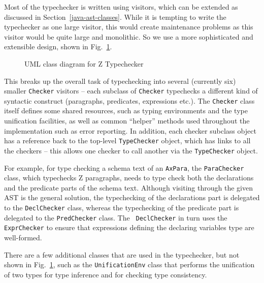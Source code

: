 \documentclass{llncs}
\begin{document}
Most of the typechecker is written using visitors, which can be
extended as discussed in Section~\ref{java-ast-classes}.  While it is
tempting to write the typechecker as one large visitor, this would
create maintenance problems as this visitor would be quite large and
monolithic.  So we use a more sophisticated and extensible design,
shown in Fig.~\ref{fig:ztypechecker}.

\def\epsfsize#1#2{0.50#1}
\begin{figure}[t]
\begin{center}
\caption{UML class diagram for Z Typechecker}\label{fig:ztypechecker}
\end{center}
\end{figure}
\def\epsfsize#1#2{\epsfxsize}

This breaks up the overall task of typechecking into several
(currently six) smaller \texttt{Checker} visitors -- each subclass of
\texttt{Checker} typechecks a different kind of syntactic construct
(paragraphs, predicates, expressions etc.).  The \texttt{Checker}
class itself defines some shared resources, such as typing
environments and the type unification facilities, as well as common
``helper'' methods used throughout the implementation such as error
reporting.  In addition, each checker subclass object has a reference
back to the top-level \texttt{TypeChecker} object, which has links to
all the checkers -- this allows one checker to call another via the
\texttt{TypeChecker} object.

For example, for type checking a schema text of an {\tt AxPara}, the
{\tt ParaChecker} class, which typechecks Z paragraphs, needs to type
check both the declarations and the predicate parts of the schema
text.  Although visiting through the given AST is the general
solution, the typechecking of the declarations part is delegated to
the {\tt DeclChecker} class, whereas the typechecking of the predicate
part is delegated to the {\tt PredChecker} class.  The {\tt
DeclChecker} in turn uses the {\tt ExprChecker} to ensure that
expressions defining the declaring variables type are well-formed.

There are a few additional classes that are used in the typechecker,
but not shown in Fig.~\ref{fig:ztypechecker}, such as the
\texttt{UnificationEnv} class that performs
the unification of two types for type inference and for checking type
consistency.
\end{document}
